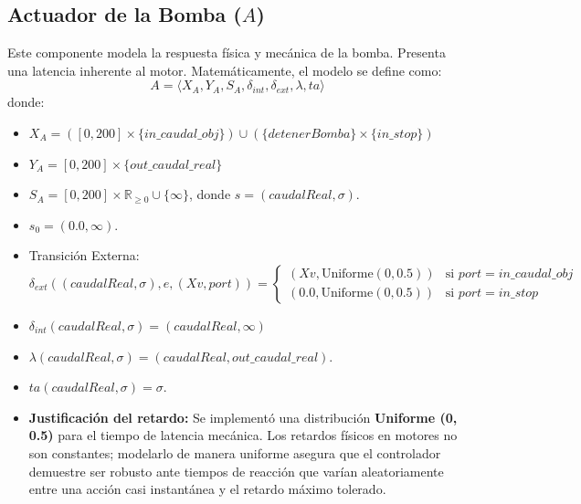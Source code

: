 \subsection{Actuador de la Bomba ($A$)}
Este componente modela la respuesta física y mecánica de la bomba. Presenta una latencia inherente al motor.
Matemáticamente, el modelo se define como:
\[ A = \langle X_A, Y_A, S_A, \delta_{int}, \delta_{ext}, \lambda, ta \rangle \]
donde:
\begin{itemize}
    \item $X_A = ([0, 200] \times \{in\_caudal\_obj\}) \cup (\{detenerBomba\} \times \{in\_stop\})$
    \item $Y_A = [0, 200] \times \{out\_caudal\_real\}$
    \item $S_A = [0, 200] \times \mathbb{R}_{\geq 0} \cup \{\infty\}$, donde $s = (caudalReal, \sigma)$.
    \item $s_0 = (0.0, \infty)$.
    \item Transición Externa:
    \[
    \delta_{ext}((caudalReal, \sigma), e, (Xv, port)) = 
    \begin{cases} 
    (Xv, \text{Uniforme}(0, 0.5)) & \text{si } port = in\_caudal\_obj \\
    (0.0, \text{Uniforme}(0, 0.5)) & \text{si } port = in\_stop 
    \end{cases}
    \]
    \item $\delta_{int}(caudalReal, \sigma) = (caudalReal, \infty)$
    \item $\lambda(caudalReal, \sigma) = (caudalReal, out\_caudal\_real)$.
    \item $ta(caudalReal, \sigma) = \sigma$.
    \item \textbf{Justificación del retardo:} Se implementó una distribución \textbf{Uniforme (0, 0.5)} para el tiempo de latencia mecánica. Los retardos físicos en motores no son constantes; modelarlo de manera uniforme asegura que el controlador demuestre ser robusto ante tiempos de reacción que varían aleatoriamente entre una acción casi instantánea y el retardo máximo tolerado.
\end{itemize}

